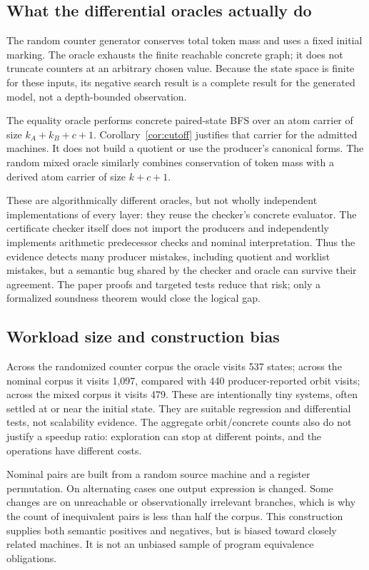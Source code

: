 \subsection{What the differential oracles actually do}
The random counter generator conserves total token mass and uses a fixed initial
marking. The oracle exhausts the finite reachable concrete graph; it does not
truncate counters at an arbitrary chosen value. Because the state space is
finite for these inputs, its negative search result is a complete result for
the generated model, not a depth-bounded observation.

The equality oracle performs concrete paired-state BFS over an atom carrier
of size $k_A+k_B+c+1$. Corollary~\ref{cor:cutoff} justifies that carrier for the
admitted machines. It does not build a quotient or use the producer's canonical
forms. The random mixed oracle similarly combines conservation of token mass
with a derived atom carrier of size $k+c+1$.

These are algorithmically different oracles, but not wholly independent
implementations of every layer: they reuse the checker's concrete evaluator.
The certificate checker itself does not import the producers and independently
implements arithmetic predecessor checks and nominal interpretation. Thus the
evidence detects many producer mistakes, including quotient and worklist
mistakes, but a semantic bug shared by the checker and oracle can survive their
agreement. The paper proofs and targeted tests reduce that risk; only a
formalized soundness theorem would close the logical gap.

\subsection{Workload size and construction bias}
Across the randomized counter corpus the oracle visits 537 states; across the
nominal corpus it visits 1,097, compared with 440 producer-reported orbit visits;
across the mixed corpus it visits 479. These are intentionally tiny systems,
often settled at or near the initial state. They are suitable regression and
differential tests, not scalability evidence. The aggregate orbit/concrete
counts also do not justify a speedup ratio: exploration can stop at different
points, and the operations have different costs.

Nominal pairs are built from a random source machine and a register permutation.
On alternating cases one output expression is changed. Some changes are on
unreachable or observationally irrelevant branches, which is why the count of
inequivalent pairs is less than half the corpus. This construction supplies
both semantic positives and negatives, but is biased toward closely related
machines. It is not an unbiased sample of program equivalence obligations.

